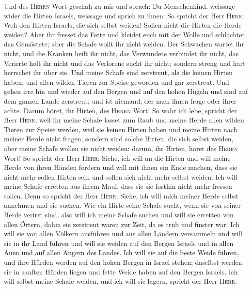  Und des \textsc{Herrn} Wort geschah zu mir und sprach:
 Du Menschenkind, weissage wider die Hirten Israels,
weissage und sprich zu ihnen: So spricht der Herr \textsc{Herr}: Weh den
Hirten Israels, die sich selbst weiden! Sollen nicht die Hirten die
Herde weiden?  Aber ihr fresset das Fette und kleidet euch
mit der Wolle und schlachtet das Gemästete; aber die Schafe wollt ihr
nicht weiden.  Der Schwachen wartet ihr nicht, und die
Kranken heilt ihr nicht, das Verwundete verbindet ihr nicht, das
Verirrte holt ihr nicht und das Verlorene sucht ihr nicht; sondern
streng und hart herrschet ihr über sie.  Und meine Schafe
sind zerstreut, als die keinen Hirten haben, und allen wilden Tieren zur
Speise geworden und gar zerstreut.  Und gehen irre hin und
wieder auf den Bergen und auf den hohen Hügeln und sind auf dem ganzen
Lande zerstreut; und ist niemand, der nach ihnen frage oder ihrer achte.
 Darum höret, ihr Hirten, des \textsc{Herrn} Wort!
 So wahr ich lebe, spricht der Herr \textsc{Herr}, weil
ihr meine Schafe lasset zum Raub und meine Herde allen wilden Tieren zur
Speise werden, weil sie keinen Hirten haben und meine Hirten nach meiner
Herde nicht fragen, sondern sind solche Hirten, die sich selbst weiden,
aber meine Schafe wollen sie nicht weiden:  darum, ihr
Hirten, höret des \textsc{Herrn} Wort!  So spricht der
Herr \textsc{Herr}: Siehe, ich will an die Hirten und will meine Herde
von ihren Händen fordern und will mit ihnen ein Ende machen, dass sie
nicht mehr sollen Hirten sein und sollen sich nicht mehr selbst weiden.
Ich will meine Schafe erretten aus ihrem Maul, dass sie sie forthin
nicht mehr fressen sollen.  Denn so spricht der Herr
\textsc{Herr}: Siehe, ich will mich meiner Herde selbst annehmen und sie
suchen.  Wie ein Hirte seine Schafe sucht, wenn sie von
seiner Herde verirrt sind, also will ich meine Schafe suchen und will
sie erretten von allen Örtern, dahin sie zerstreut waren zur Zeit, da es
trüb und finster war.  Ich will sie von allen Völkern
ausführen und aus allen Ländern versammeln und will sie in ihr Land
führen und will sie weiden auf den Bergen Israels und in allen Auen und
auf allen Angern des Landes.  Ich will sie auf die beste
Weide führen, und ihre Hürden werden auf den hohen Bergen in Israel
stehen; daselbst werden sie in sanften Hürden liegen und fette Weide
haben auf den Bergen Israels.  Ich will selbst meine
Schafe weiden, und ich will sie lagern, spricht der Herr \textsc{Herr}.
